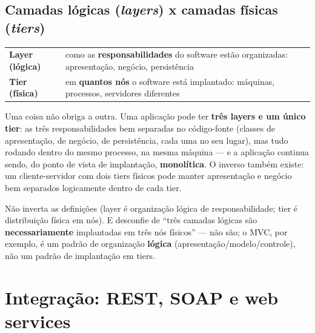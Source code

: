 \subsection{Camadas lógicas (\textit{layers}) x camadas físicas (\textit{tiers})}

\begin{conceito}
\begin{center}
\begin{tabular}{@{}p{3.4cm}p{8.6cm}@{}}
\toprule
\textbf{Layer (lógica)} & como as \textbf{responsabilidades} do software
estão organizadas: apresentação, negócio, persistência \\
\textbf{Tier (física)} & em \textbf{quantos nós} o software está implantado:
máquinas, processos, servidores diferentes \\
\bottomrule
\end{tabular}
\end{center}

Uma coisa não obriga a outra. Uma aplicação pode ter \textbf{três layers e
um único tier}: as três responsabilidades bem separadas no código-fonte
(classes de apresentação, de negócio, de persistência, cada uma no seu
lugar), mas tudo rodando dentro do mesmo processo, na mesma máquina --- e a
aplicação continua sendo, do ponto de vista de implantação,
\textbf{monolítica}. O inverso também existe: um cliente-servidor com dois
tiers físicos pode manter apresentação e negócio bem separados
logicamente dentro de cada tier.
\end{conceito}

\begin{cuidado}
Não inverta as definições (layer é organização lógica de responsabilidade;
tier é distribuição física em nós). E desconfie de “três camadas lógicas
são \textbf{necessariamente} implantadas em três nós físicos” --- não são;
o MVC, por exemplo, é um padrão de organização \textbf{lógica}
(apresentação/modelo/controle), não um padrão de implantação em tiers.
\end{cuidado}

\section{Integração: REST, SOAP e web services}

